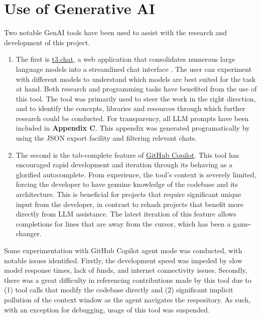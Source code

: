 \documentclass[12pt,a4paper,twoside]{report}
\begin{document}
\section{Use of Generative AI}

Two notable GenAI tools have been used to assist with the research and development of this project.

\begin{enumerate}

\item The first is \href{https://t3.chat}{t3.chat}, a web application that consolidates numerous large language models into a streamlined chat interface \cite{t3chat}. The user can experiment with different models to understand which models are best suited for the task at hand.
Both research and programming tasks have benefited from the use of this tool.
The tool was primarily used to steer the work in the right direction, and to identify the concepts, libraries and resources through which further research could be conducted. For transparency, all LLM prompts have been included in \textbf{Appendix C}. This appendix was generated programatically by using the JSON export facility and filtering relevant chats.

\item The second is the tab-complete feature of \href{https://github.com/features/copilot}{GitHub Copilot}. This tool has encouraged rapid development and iteration through its behaving as a glorified autocomplete. From experience, the tool's context is severely limited, forcing the developer to have genuine knowledge of the codebase and its architecture. This is beneficial for projects that require significant unique input from the developer, in contrast to rehash projects that benefit more directly from LLM assistance. The latest iteration of this feature allows completions for lines that are away from the cursor, which has been a game-changer.

\end{enumerate}

Some experimentation with GitHub Copilot agent mode was conducted, with notable issues identified. Firstly, the development speed was impeded by slow model response times, lack of funds, and internet connectivity issues. Secondly, there was a great difficulty in referencing contributions made by this tool due to (1) tool calls that modify the codebase directly and (2) significant implicit pollution of the context window as the agent navigates the respository. As such, with an exception for debugging, usage of this tool was suspended.
\end{document}
